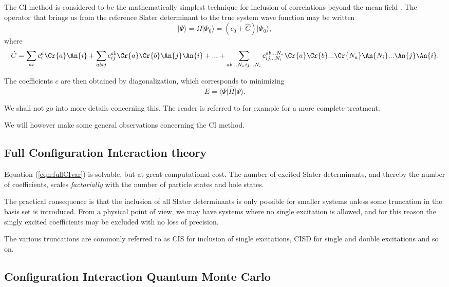The CI method is considered to be the mathematically simplest
technique for inclusion of correlations beyond the mean
field \cite{Harris}. The operator that brings us from the reference
Slater determinant to the true system wave function may be written
\begin{equation}
\vert \Psi \rangle = \Omega \vert  \Phi_0 \rangle = (c_0 + \hat{C}) \vert  \Phi_0 \rangle,
\end{equation}
where
\begin{equation}
\hat{C} = \sum_{ai} c^{a}_i \Cr{a} \An{i}+  \sum_{abij} c^{ab}_{ij} \Cr{a} \Cr{b} \An{j} \An{i} + ... + \sum_{ab...N_a ij...N_i} c^{ab...N_a}_{ij...N_i} \Cr{a} \Cr{b} ... \Cr{N_a} \An{N_i} ... \An{j} \An{i}.
\end{equation}

The coefficients $c$ are then obtained by diagonalization, which corresponds to  minimizing 
\begin{equation}
E = \langle \Psi \vert \hat{H} \vert \Psi \rangle.
\label{eqn:fullCIvar}
\end{equation}

We shall not go into more details concerning this. The reader is
referred to for example \cite[p.177]{Harris} for a more complete
treatment.

We will however make some general observations concerning the CI method. 

\subsection{Full Configuration Interaction theory}

Equation (\ref{eqn:fullCIvar}) is solvable, but at great
computational cost. The number of excited Slater determinants, and
thereby the number of coefficients, scales \emph{factorially} with the
number of particle states and hole states.

The practical consequence is that the inclusion of all Slater
determinants is only possible for smaller systems unless some
truncation in the basis set is introduced. From a physical
point of view, we may have systems where no single excitation is
allowed, and for this reason the singly excited coefficients may be
excluded with no loss of precision.

The various truncations are commonly referred to as CIS for inclusion
of single excitations, CISD for single and double excitations and so
on.

\subsection{Configuration Interaction Quantum Monte Carlo}

